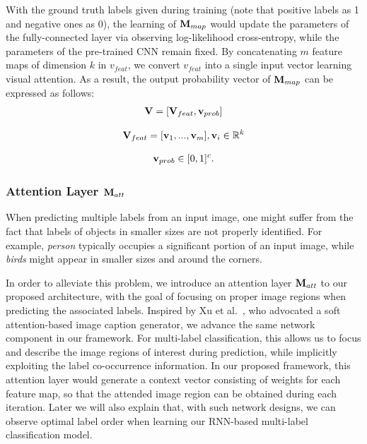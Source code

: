 \documentclass[letterpaper]{article} %
\begin{document}
With the ground truth labels given during training (note that positive labels as 1 and negative ones as 0), the learning of $\mathbf{M}_{map}$ would update the parameters of the fully-connected layer via observing log-likelihood cross-entropy, while the parameters of the pre-trained CNN remain fixed. By concatenating $m$ feature maps of dimension $k$ in $v_{feat}$, we convert $v_{feat}$ into a single input vector learning visual attention. As a result, the output probability vector of $\mathbf{M}_{map}$ can be expressed as follows:
\begin{equation}
\label{eq:feats}
\begin{aligned}
\mathbf{V} = [\mathbf{V}_{feat}, \mathbf{v}_{prob}]
\end{aligned}
\end{equation}

\begin{equation}
\label{eq:V_feat}
\begin{aligned}
\mathbf{V}_{feat} = [\mathbf{v}_1, ..., \mathbf{v}_m], \mathbf{v}_i \in \mathbb{R}^k
\end{aligned}
\end{equation}

\begin{equation}
\label{eq:V_prob}
\begin{aligned} \mathbf{v}_{prob} \in [0, 1]^c.
\end{aligned}
\end{equation}

\subsubsection{Attention Layer $\mathbf{M}_{att}$}
When predicting multiple labels from an input image, one might suffer from the fact that labels of objects in smaller sizes are not properly identified. For example, \emph{person} typically occupies a significant portion of an input image, while \emph{birds} might appear in smaller sizes and around the corners.

In order to alleviate this problem, we introduce an attention layer $\mathbf{M}_{att}$ to our proposed architecture, with the goal of focusing on proper image regions when predicting the associated labels. Inspired by Xu et al.~\cite{xu2015show}, who advocated a soft attention-based image caption generator, we advance the same network component in our framework. For multi-label classification, this allows us to focus and describe the image regions of interest during prediction, while implicitly exploiting the label co-occurrence information. In our proposed framework, this attention layer would generate a context vector consisting of weights for each feature map, so that the attended image region can be obtained during each iteration. Later we will also explain that, with such network designs, we can observe optimal label order when learning our RNN-based multi-label classification model.
\end{document}
